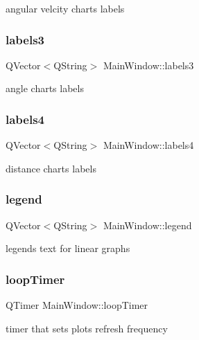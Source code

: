 angular velcity chart\textquotesingle{}s labels \mbox{\label{class_main_window_ab9b1318826e6722ec4a5dd99cd0ae353}} 
\subsubsection{labels3}
{\footnotesize\ttfamily Q\+Vector$<$Q\+String$>$ Main\+Window\+::labels3\hspace{0.3cm}{\ttfamily [private]}}

angle chart\textquotesingle{}s labels \mbox{\label{class_main_window_a513d5d910d4ece239f1a25d6240869ce}} 
\subsubsection{labels4}
{\footnotesize\ttfamily Q\+Vector$<$Q\+String$>$ Main\+Window\+::labels4\hspace{0.3cm}{\ttfamily [private]}}

distance chart\textquotesingle{}s labels \mbox{\label{class_main_window_a80e2a1a6949dc004e0729bdb133497dd}} 
\subsubsection{legend}
{\footnotesize\ttfamily Q\+Vector$<$Q\+String$>$ Main\+Window\+::legend\hspace{0.3cm}{\ttfamily [private]}}

legend\textquotesingle{}s text for linear graphs \mbox{\label{class_main_window_a623ca812f462c5bc27daf8a94cff59d1}} 
\subsubsection{loop\+Timer}
{\footnotesize\ttfamily Q\+Timer Main\+Window\+::loop\+Timer\hspace{0.3cm}{\ttfamily [private]}}

timer that sets plots refresh frequency \mbox{\label{class_main_window_a79199e3cec2bb50434f184cc762bce2e}} 
